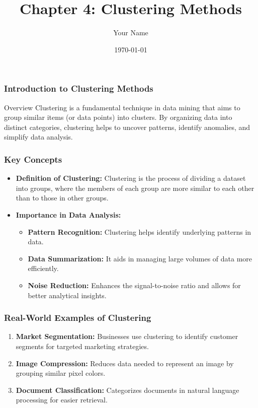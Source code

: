 \documentclass{beamer}
\title{Chapter 4: Clustering Methods}
\author{Your Name}
\institute{Your Institution}
\date{\today}
\begin{document}
\frame{\titlepage}

\begin{frame}[fragile]
    \frametitle{Introduction to Clustering Methods}
    \begin{block}{Overview}
        Clustering is a fundamental technique in data mining that aims to group similar items (or data points) into clusters. By organizing data into distinct categories, clustering helps to uncover patterns, identify anomalies, and simplify data analysis.
    \end{block}
\end{frame}

\begin{frame}[fragile]
    \frametitle{Key Concepts}
    \begin{itemize}
        \item \textbf{Definition of Clustering:}
        Clustering is the process of dividing a dataset into groups, where the members of each group are more similar to each other than to those in other groups.

        \item \textbf{Importance in Data Analysis:}
        \begin{itemize}
            \item \textbf{Pattern Recognition:} 
            Clustering helps identify underlying patterns in data.
            \item \textbf{Data Summarization:} 
            It aids in managing large volumes of data more efficiently.
            \item \textbf{Noise Reduction:} 
            Enhances the signal-to-noise ratio and allows for better analytical insights.
        \end{itemize}
    \end{itemize}
\end{frame}

\begin{frame}[fragile]
    \frametitle{Real-World Examples of Clustering}
    \begin{enumerate}
        \item \textbf{Market Segmentation:} Businesses use clustering to identify customer segments for targeted marketing strategies.
        \item \textbf{Image Compression:} Reduces data needed to represent an image by grouping similar pixel colors.
        \item \textbf{Document Classification:} Categorizes documents in natural language processing for easier retrieval.
    \end{enumerate}
\end{frame}
\end{document}
